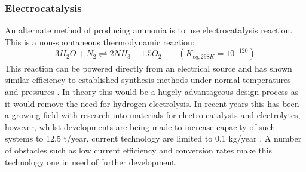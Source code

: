 \documentclass[11pt, a4paper]{article}
\begin{document}
{\subsubsection{Electrocatalysis}
An alternate method of producing ammonia is to use electrocatalysis reaction. This is a non-spontaneous thermodynamic reaction:
\begin{equation}
3H_2O+N_2   \underset{ }{\stackrel{ }{\rightleftharpoons}}   2NH_3 + 1.5O_2 \qquad (K_{eq,298K} = 10^{-120})
\end{equation}	
This reaction can be powered directly from an electrical source and has shown similar efficiency to established synthesis methods under normal temperatures and pressures \cite{Liu2014}. In theory this would be a hugely advantageous design process as it would remove the need for hydrogen electrolysis. In recent years this has been a growing field with research into materials for electro-catalysts and electrolytes, however, whilst developments are being made to increase capacity of such systems to 12.5 t/year, current technology are limited to 0.1 kg/year \cite{Gellett2016}. A number of obstacles such as low current efficiency and conversion rates make this technology one in need of further development. %
{\begin{figure}[h]
		\centering
		
		{\centering
			
}
\end{figure}}}
\end{document}
